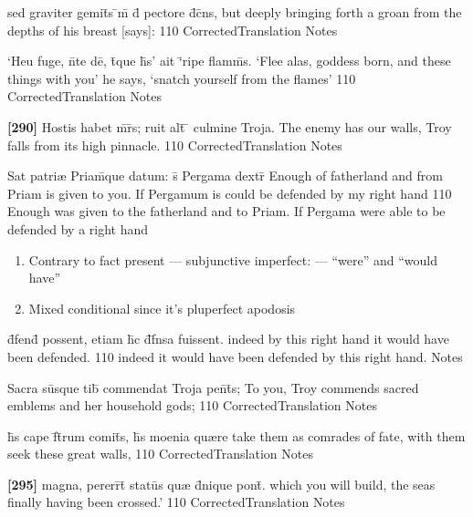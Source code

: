 \latline
  {sed graviter gemit\={}s \={\macron {\i}}m\={} d\={} pectore d\={}c\={}ns,}
  { but deeply bringing forth a groan from the depths of his breast [says]: }
  {110}
  { CorrectedTranslation }
  { Notes }


\latline
  {`Heu fuge, n\={}te de\={}, t\={}que h\={\macron {\i}}s' ait `\={}ripe flamm\={\macron {\i}}s.}
  { `Flee alas, goddess born, and these things with you' he says, `snatch yourself from the flames' }
  {110}
  { CorrectedTranslation }
  { Notes }


\latline
  {\textbf{[290]} Hostis habet m\={}r\={}s; ruit alt\={} \={} culmine Troja.}
  { The enemy has our walls, Troy falls from its high pinnacle. }
  {110}
  { CorrectedTranslation }
  { Notes }


\latline
  {Sat patri{\ae} Priam\={}que datum: s\={\macron {\i}} Pergama dextr\={}}
  { Enough of fatherland and from Priam is given to you.  If Pergamum is could be defended by my right hand }
  {110}
  { Enough was given to the fatherland and to Priam. If Pergama were able to be defended by a right hand}
  { \begin{enumerate}
  	\item Contrary to fact present --- subjunctive imperfect:  --- ``were'' and ``would have''
  	\item Mixed conditional since it's pluperfect apodosis
  \end{enumerate} }


\latline
  {d\={}fend\={\macron {\i}} possent, etiam h\={}c d\={}f\={}nsa fuissent.}
  { indeed by this right hand it would have been defended. }
  {110}
  { indeed it would have been defended by this right hand. }
  { Notes }


\latline
  {Sacra su\={}sque tib\={\macron {\i}} commendat Troja pen\={}t\={\macron {\i}}s;}
  { To you, Troy commends sacred emblems and her household gods; }
  {110}
  { CorrectedTranslation }
  { Notes }


\latline
  {h\={}s cape f\={}t\={}rum comit\={}s, h\={\macron {\i}}s moenia qu{\ae}re }
  { take them as comrades of fate, with them seek these great walls, }
  {110}
  { CorrectedTranslation }
  { Notes }


\latline
  {\textbf{[295]} magna, pererr\={}t\={} statu\={}s qu{\ae} d\={}nique pont\={}.}
  { which you will build, the seas finally having been crossed.' }
  {110}
  { CorrectedTranslation }
  { Notes }


